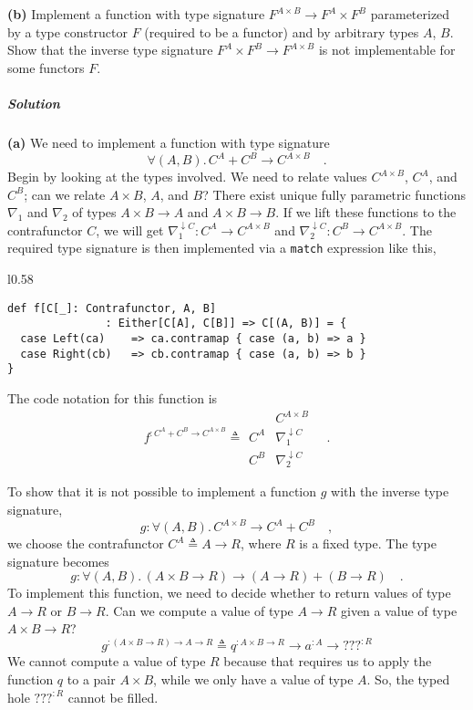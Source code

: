 \textbf{(b)} Implement a function with type signature $F^{A\times B}\rightarrow F^{A}\times F^{B}$
parameterized by a type constructor $F$ (required to be a functor)
and by arbitrary types $A$, $B$. Show that the inverse type signature
$F^{A}\times F^{B}\rightarrow F^{A\times B}$ is not implementable
for some functors $F$.

\subparagraph{Solution}

\textbf{(a)} We need to implement a function with type signature
\[
\forall(A,B).\,C^{A}+C^{B}\rightarrow C^{A\times B}\quad.
\]
Begin by looking at the types involved. We need to relate values $C^{A\times B}$,
$C^{A}$, and $C^{B}$; can we relate $A\times B$, $A$, and $B$?
There exist unique fully parametric functions $\nabla_{1}$ and $\nabla_{2}$
of types $A\times B\rightarrow A$ and $A\times B\rightarrow B$.
If we lift these functions to the contrafunctor $C$, we will get
$\nabla_{1}^{\downarrow C}:C^{A}\rightarrow C^{A\times B}$ and $\nabla_{2}^{\downarrow C}:C^{B}\rightarrow C^{A\times B}$.
The required type signature is then implemented via a \lstinline!match!
expression like this,

\begin{wrapfigure}{l}{0.58\columnwidth}%
\vspace{-0.75\baselineskip}
\begin{lstlisting}
def f[C[_]: Contrafunctor, A, B]
               : Either[C[A], C[B]] => C[(A, B)] = {
  case Left(ca)    => ca.contramap { case (a, b) => a }
  case Right(cb)   => cb.contramap { case (a, b) => b }
}
\end{lstlisting}

\vspace{-3\baselineskip}
\end{wrapfigure}%

\noindent The code notation for this function is\vspace{-0.25\baselineskip}
\[
f^{:C^{A}+C^{B}\rightarrow C^{A\times B}}\triangleq\begin{array}{|c||c|}
 & C^{A\times B}\\
\hline C^{A} & \nabla_{1}^{\downarrow C}\\
C^{B} & \nabla_{2}^{\downarrow C}
\end{array}\quad.
\]
\vspace{-0.85\baselineskip}

To show that it is not possible to implement a function $g$ with
the inverse type signature,
\[
g:\forall(A,B).\,C^{A\times B}\rightarrow C^{A}+C^{B}\quad,
\]
we choose the contrafunctor $C^{A}\triangleq A\rightarrow R$, where
$R$ is a fixed type. The type signature becomes
\[
g:\forall(A,B).\,(A\times B\rightarrow R)\rightarrow(A\rightarrow R)+(B\rightarrow R)\quad.
\]
To implement this function, we need to decide whether to return values
of type $A\rightarrow R$ or $B\rightarrow R$. Can we compute a value
of type $A\rightarrow R$ given a value of type $A\times B\rightarrow R$?
\[
g^{:(A\times B\rightarrow R)\rightarrow A\rightarrow R}\triangleq q^{:A\times B\rightarrow R}\rightarrow a^{:A}\rightarrow\text{???}^{:R}
\]
We cannot compute a value of type $R$ because that requires us to
apply the function $q$ to a pair $A\times B$, while we only have
a value of type $A$. So, the typed hole $\text{???}^{:R}$ cannot
be filled. 

